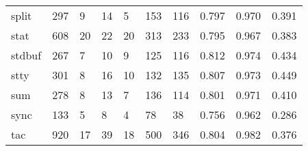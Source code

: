 \begin{longtable}{lp{2.0cm}p{2.0cm}p{2.0cm}p{2.0cm}p{2.0cm}p{2.0cm}p{2.0cm}p{2.0cm}p{2.0cm}}
split     &                    297 &                                  9 &                                14 &                                5 &                               153 &                             116 &                                   0.797 &                                  0.970 &                                0.391 \\
stat      &                    608 &                                 20 &                                22 &                               20 &                               313 &                             233 &                                   0.795 &                                  0.967 &                                0.383 \\
stdbuf    &                    267 &                                  7 &                                10 &                                9 &                               125 &                             116 &                                   0.812 &                                  0.974 &                                0.434 \\
stty      &                    301 &                                  8 &                                16 &                               10 &                               132 &                             135 &                                   0.807 &                                  0.973 &                                0.449 \\
sum       &                    278 &                                  8 &                                13 &                                7 &                               136 &                             114 &                                   0.801 &                                  0.971 &                                0.410 \\
sync      &                    133 &                                  5 &                                 8 &                                4 &                                78 &                              38 &                                   0.756 &                                  0.962 &                                0.286 \\
tac       &                    920 &                                 17 &                                39 &                               18 &                               500 &                             346 &                                   0.804 &                                  0.982 &                                0.376 \\

\end{longtable}
